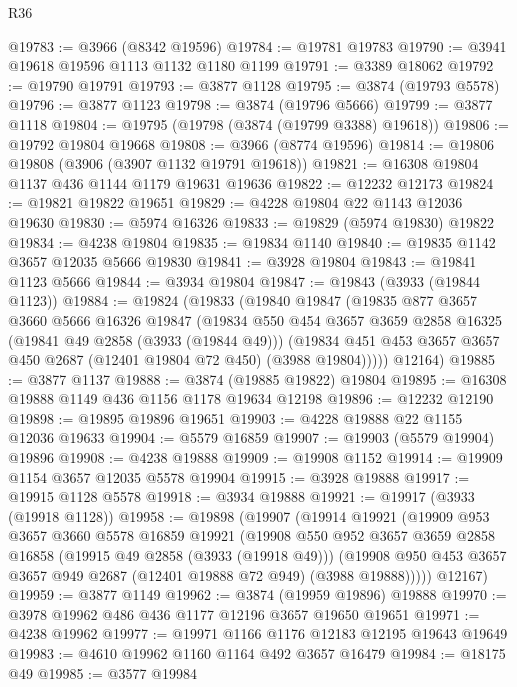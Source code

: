 \begin{lexlean}{R36}
\begin{coremodule}
@19783 := @3966 (@8342 @19596)
@19784 := @19781 @19783
@19790 := @3941 @19618 @19596 @1113 @1132 @1180 @1199
@19791 := @3389 @18062
@19792 := @19790 @19791
@19793 := @3877 @1128
@19795 := @3874 (@19793 @5578)
@19796 := @3877 @1123
@19798 := @3874 (@19796 @5666)
@19799 := @3877 @1118
@19804 := @19795 (@19798 (@3874 (@19799 @3388) @19618))
@19806 := @19792 @19804 @19668
@19808 := @3966 (@8774 @19596)
@19814 := @19806 @19808 (@3906 (@3907 @1132 @19791 @19618))
@19821 := @16308 @19804 @1137 @436 @1144 @1179 @19631 @19636
@19822 := @12232 @12173
@19824 := @19821 @19822 @19651
@19829 := @4228 @19804 @22 @1143 @12036 @19630
@19830 := @5974 @16326
@19833 := @19829 (@5974 @19830) @19822
@19834 := @4238 @19804
@19835 := @19834 @1140
@19840 := @19835 @1142 @3657 @12035 @5666 @19830
@19841 := @3928 @19804
@19843 := @19841 @1123 @5666
@19844 := @3934 @19804
@19847 := @19843 (@3933 (@19844 @1123))
@19884 := @19824
    (@19833
      (@19840
        @19847
        (@19835
          @877
          @3657
          @3660
          @5666
          @16326
          @19847
          (@19834
            @550
            @454
            @3657
            @3659
            @2858
            @16325
            (@19841 @49 @2858 (@3933 (@19844 @49)))
            (@19834 @451 @453 @3657 @3657 @450 @2687 (@12401 @19804 @72 @450) (@3988 @19804)))))
      @12164)
@19885 := @3877 @1137
@19888 := @3874 (@19885 @19822) @19804
@19895 := @16308 @19888 @1149 @436 @1156 @1178 @19634 @12198
@19896 := @12232 @12190
@19898 := @19895 @19896 @19651
@19903 := @4228 @19888 @22 @1155 @12036 @19633
@19904 := @5579 @16859
@19907 := @19903 (@5579 @19904) @19896
@19908 := @4238 @19888
@19909 := @19908 @1152
@19914 := @19909 @1154 @3657 @12035 @5578 @19904
@19915 := @3928 @19888
@19917 := @19915 @1128 @5578
@19918 := @3934 @19888
@19921 := @19917 (@3933 (@19918 @1128))
@19958 := @19898
    (@19907
      (@19914
        @19921
        (@19909
          @953
          @3657
          @3660
          @5578
          @16859
          @19921
          (@19908
            @550
            @952
            @3657
            @3659
            @2858
            @16858
            (@19915 @49 @2858 (@3933 (@19918 @49)))
            (@19908 @950 @453 @3657 @3657 @949 @2687 (@12401 @19888 @72 @949) (@3988 @19888)))))
      @12167)
@19959 := @3877 @1149
@19962 := @3874 (@19959 @19896) @19888
@19970 := @3978 @19962 @486 @436 @1177 @12196 @3657 @19650 @19651
@19971 := @4238 @19962
@19977 := @19971 @1166 @1176 @12183 @12195 @19643 @19649
@19983 := @4610 @19962 @1160 @1164 @492 @3657 @16479
@19984 := @18175 @49
@19985 := @3577 @19984

\end{coremodule}
\end{lexlean}
